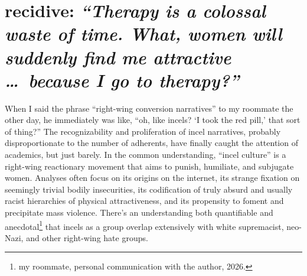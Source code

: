 \documentclass[11pt]{article}
\begin{document}
%
%
%
%
\section*{recidive: {\itshape ``Therapy is a colossal waste of time. What, women will suddenly find me attractive \dots\ because I go to therapy?''}\autocite[70]{Ke24}}
 
When I said the phrase ``right-wing conversion narratives'' to my roommate the other day, he immediately was like, ``oh, like incels? `I took the red pill,' that sort of thing?'' The recognizability and proliferation of incel narratives, probably disproportionate to the number of adherents, have finally caught the attention of academics, but just barely. In the common understanding, ``incel culture'' is a right-wing reactionary movement that aims to punish, humiliate, and subjugate women. Analyses often focus on its origins on the internet, its strange fixation on seemingly trivial bodily insecurities, its codification of truly absurd and usually racist hierarchies of physical attractiveness, and its propensity to foment and precipitate mass violence.\autocite[68]{Ke24} There's an understanding both quantifiable\autocite[in][the authors compare a body of canonical white supremacist texts with masculinist ones, using statistical techniques to detect overlapping topics and sentiments.]{PLPV22} and anecdotal\footnote{my roommate, personal communication with the author, 2026.} that incels as a group overlap extensively with white supremacist, neo-Nazi, and other right-wing hate groups. 
\end{document}
